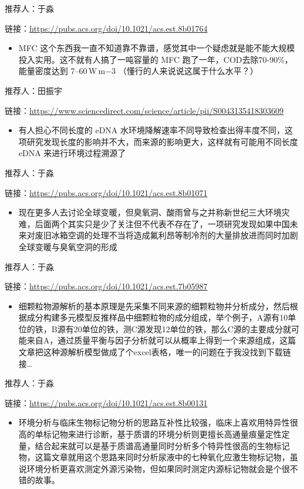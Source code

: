 \documentclass[]{book}
\providecommand{\tightlist}{%
  \setlength{\itemsep}{0pt}\setlength{\parskip}{0pt}}
\begin{document}
推荐人：于淼

链接：\url{https://pubs.acs.org/doi/10.1021/acs.est.8b01764}

\begin{itemize}
\tightlist
\item
  MFC 这个东西我一直不知道靠不靠谱，感觉其中一个疑虑就是能不能大规模投入实用。这不就有人搞了一吨容量的 MFC 跑了一年，COD去除70-90\%，能量密度达到 7--60\,W\,m−3 （懂行的人来说说这属于什么水平？）
\end{itemize}

推荐人：田振宇

链接：\url{https://www.sciencedirect.com/science/article/pii/S0043135418303609}

\begin{itemize}
\tightlist
\item
  有人担心不同长度的 eDNA 水环境降解速率不同导致检查出得丰度不同，这项研究发现长度的影响并不大，而来源的影响更大，这样就有可能用不同长度 eDNA 来进行环境过程溯源了
\end{itemize}

推荐人：于淼

链接：\url{https://pubs.acs.org/doi/10.1021/acs.est.8b01071}

\begin{itemize}
\tightlist
\item
  现在更多人去讨论全球变暖，但臭氧洞、酸雨曾与之并称新世纪三大环境灾难，后面两个其实只是少了关注但不代表不存在了，一项研究发现如果中国未来对废旧冰箱空调的处理不当将造成氟利昂等制冷剂的大量排放进而同时加剧全球变暖与臭氧空洞的形成
\end{itemize}

推荐人：于淼

链接：\url{https://pubs.acs.org/doi/10.1021/acs.est.7b05987}

\begin{itemize}
\tightlist
\item
  细颗粒物源解析的基本原理是先采集不同来源的细颗粒物并分析成分，然后根据成分构建多元模型反推样品中细颗粒物的成分组成，举个例子，A源有10单位的铁，B源有20单位的铁，测C源发现12单位的铁，那么C源的主要成分就可能来自A，通过质量平衡与因子分析就可以从概率上得到一个来源组成，这篇文章把这种源解析模型做成了个excel表格，唯一的问题在于我没找到下载链接\ldots{}
\end{itemize}

推荐人：于淼

链接：\url{https://pubs.acs.org/doi/10.1021/acs.est.8b00131}

\begin{itemize}
\tightlist
\item
  环境分析与临床生物标记物分析的思路互补性比较强，临床上喜欢用特异性很高的单标记物来进行诊断，基于质谱的环境分析则更擅长高通量痕量定性定量，结合起来就可以是基于质谱高通量同时分析多个特异性很高的生物标记物，这篇文章就用这个思路来同时分析尿液中的七种氧化应激生物标记物，虽说环境分析更喜欢测定外源污染物，但如果同时测定内源标记物就会是个很不错的故事。
\end{itemize}
\end{document}
